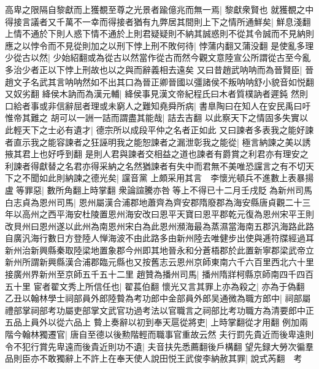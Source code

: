 高卑之限隔自黎獻而上獲覩至尊之光景者踰億兆而無一焉|{
	黎獻衆賢也}
就獲覩之中得接言議者又千萬不一幸而得接者猶有九弊居其間則上下之情所通鮮矣|{
	鮮息淺翻}
上情不通於下則人惑下情不通於上則君疑疑則不納其誠惑則不從其令誠而不見納則應之以悖令而不見從則加之以刑下悖上刑不敗何待|{
	悖蒲内翻又蒲没翻}
是使亂多理少從古以然|{
	少始紹翻或為從古以然當作從古而然今觀文意陸宣公所謂從古至今亂多治少者正以下悖上刑故也以之與而辭義相去遠矣}
又曰昔趙武呐呐而為晉賢臣|{
	晉趙文子名武其言呐呐然如不出其口為晉正卿晉國以彊諸侯不叛呐呐舒小貌音如悦翻又奴劣翻}
絳侯木訥而為漢元輔|{
	絳侯事見漢文帝紀程氏曰木者質樸訥者遲鈍}
然則口給者事或非信辭屈者理或未窮人之難知堯舜所病|{
	書臯陶曰在知人在安民禹曰吁惟帝其難之}
胡可以一詶一詰而謂盡其能哉|{
	詰去吉翻}
以此察天下之情固多失實以此輕天下之士必有遺才|{
	德宗所以成段平仲之名者正如此}
又曰諫者多表我之能好諫者直示我之能容諫者之狂誣明我之能恕諫者之漏泄彰我之能從|{
	極言納諫之美以誘掖其君上也好呼到翻}
是則人君與諫者交相益之道也諫者有爵賞之利君亦有理安之利諫者得獻替之名君亦得采納之名然猶諫者有失中而君無不美唯恐讜言之有不切天下之不聞如此則納諫之德光矣|{
	讜音黨}
上頗采用其言　李懷光頓兵不進數上表暴揚盧等罪惡|{
	數所角翻上時掌翻}
衆論諠騰亦咎等上不得已十二月壬戌貶為新州司馬白志貞為恩州司馬|{
	恩州屬漢合浦郡地蕭齊為齊安郡隋廢郡為海安縣唐貞觀二十三年以高州之西平海安杜陵置恩州海安改曰恩平天寶曰恩平郡乾元復為恩州宋平王則改貝州曰恩州遂以此州為南恩州宋白為此恩州瀕海最為蒸濕當海南五郡汎海路此路自廣汎海行數日方登陸人惮海波不由此路多由新州陸去唯健步出使與逓符牒經過耳新州治新興縣秦取陸梁地置象郡今州即其地晉永和分蒼梧郡於此置新寧郡梁武帝立新州所謂新興縣漢合浦郡臨元縣也又按舊志云恩州京師東南六千六百里西北六十里接廣州界新州至京師五千五十二里}
趙贊為播州司馬|{
	播州隋牂柯縣京師南四千四百五十里}
宦者翟文秀上所信任也|{
	翟萇伯翻}
懷光又言其罪上亦為殺之|{
	亦為于偽翻}
乙丑以翰林學士祠部員外郎陸䞇為考功郎中金部員外郎吴通微為職方郎中|{
	祠部屬禮部掌祠部考功屬吏部掌文武官功過考法以官職言之祠部比考功職方為清要郎中正五品上員外以從六品上}
䞇上奏辭以初到奉天扈從將吏|{
	上時掌翻從才用翻}
例加兩階今翰林獨遷官|{
	唐自至德以後勲階輕而職事官重故云然}
夫行罰先貴近而後卑遠則令不犯行賞先卑遠而後貴近則功不遺|{
	夫音扶先悉薦翻後戶構翻}
望先録大勞次徧羣品則臣亦不敢獨辭上不許上在奉天使人說田悦王武俊李納赦其罪|{
	說式芮翻　考}


